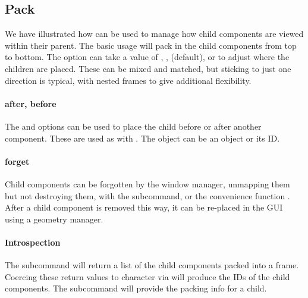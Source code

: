 \subsection{Pack}
\label{sec:tcltk:pack}


We have illustrated how  can be used to manage how
child components are viewed within their parent. The basic usage
 will pack in the child components from top to
bottom. The  option can take a value of
, ,  (default), or 
to adjust where the children are placed. These can be mixed and
matched, but sticking to just one direction is typical, with nested
frames to give additional flexibility.

\paragraph{after, before}
The  and  options can be
used to place the child before or after another component. These are
used as with . The object
 can be an \R\/ object or its ID. 


\paragraph{forget}
Child components can be forgotten by the window manager, unmapping
them but not destroying them, with the 
subcommand, or the convenience function
. After a child component is removed this way,
it can be re-placed in the GUI using a geometry manager. 

\paragraph{Introspection}
The subcommand  will return a list of the
child components packed into a frame. Coercing these return values to
character via  will produce the IDs of the child
components. The subcommand  will provide the
packing info for a child.
\\

